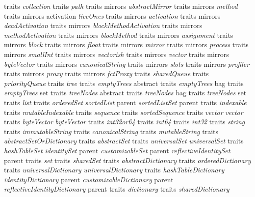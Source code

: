 traits \textit{collection}
    traits \textit{path}
    traits mirrors \textit{abstractMirror}
        traits mirrors \textit{method}
            traits mirrors activation \textit{liveOnes}
                traits mirrors \textit{activation}
                    traits mirrors \textit{deadActivation}
                    traits mirrors \textit{blockMethodActivation}
                    traits mirrors \textit{methodActivation}
            traits mirrors \textit{blockMethod}
        traits mirrors \textit{assignment}
        traits mirrors \textit{block}
        traits mirrors \textit{float}
        traits mirrors \textit{mirror}
        traits mirrors \textit{process}
        traits mirrors \textit{smallInt}
        traits mirrors \textit{vectorish}
            traits mirrors \textit{vector}
            traits mirrors \textit{byteVector}
                traits mirrors \textit{canonicalString}
        traits mirrors \textit{slots}
            traits mirrors \textit{profiler}
            traits mirrors \textit{proxy}
                traits mirrors \textit{fctProxy}
    traits \textit{sharedQueue}
    traits \textit{priorityQueue}
    traits \textit{tree}
        traits \textit{emptyTrees} abstract
            traits \textit{emptyTrees} bag
            traits \textit{emptyTrees} set
        traits \textit{treeNodes} abstract
            traits \textit{treeNodes} bag
            traits \textit{treeNodes} set
    traits \textit{list}
        traits \textit{orderedSet}
        \textit{sortedList} parent
            \textit{sortedListSet} parent
    traits \textit{indexable}
        traits \textit{mutableIndexable}
            traits \textit{sequence}
                traits \textit{sortedSequence}
            traits \textit{vector}
                \textit{vector}
            traits \textit{byteVector}
                \textit{byteVector}
                traits \textit{int32or64}
                    traits \textit{int64}
                    traits \textit{int32}
                traits \textit{string}
                    traits \textit{immutableString}
                        traits \textit{canonicalString}
                    traits \textit{mutableString}
    traits \textit{abstractSetOrDictionary}
        traits \textit{abstractSet}
            traits \textit{universalSet}
                \textit{universalSet}
            traits \textit{hashTableSet}
                \textit{identitySet} parent
                \textit{customizableSet} parent
                \textit{reflectiveIdentitySet} parent
                traits \textit{set}
                traits \textit{sharedSet}
        traits \textit{abstractDictionary}
            traits \textit{orderedDictionary}
            traits \textit{universalDictionary}
                \textit{universalDictionary}
            traits \textit{hashTableDictionary}
                \textit{identityDictionary} parent
                \textit{customizableDictionary} parent
                \textit{reflectiveIdentityDictionary} parent
                traits \textit{dictionary}
                traits \textit{sharedDictionary}